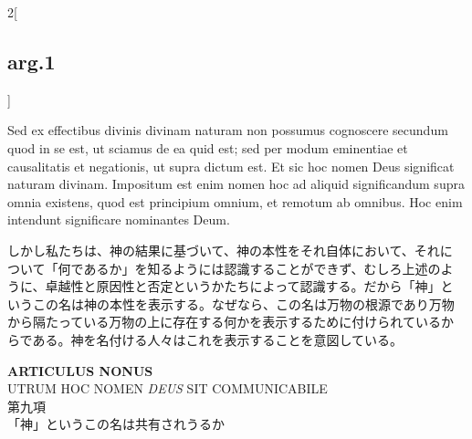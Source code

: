 \documentclass[paper=a4paper,fontsize=10pt,jafontsize=9pt,titlepage]{jlreq}
\begin{document}
\begin{paracol}{2}[\subsection{arg.1}]
\switchcolumn*

Sed ex effectibus divinis divinam naturam non possumus cognoscere
secundum quod in se est, ut sciamus de ea quid est; sed per modum
eminentiae et causalitatis et negationis, ut supra dictum est. Et sic
hoc nomen Deus significat naturam divinam. Impositum est enim nomen
hoc ad aliquid significandum supra omnia existens, quod est principium
omnium, et remotum ab omnibus. Hoc enim intendunt significare
nominantes Deum.

\switchcolumn

しかし私たちは、神の結果に基づいて、神の本性をそれ自体において、それに
ついて「何であるか」を知るようには認識することができず、むしろ上述のよ
うに、卓越性と原因性と否定というかたちによって認識する。だから「神」と
いうこの名は神の本性を表示する。なぜなら、この名は万物の根源であり万物
から隔たっている万物の上に存在する何かを表示するために付けられているか
らである。神を名付ける人々はこれを表示することを意図している。

\end{paracol}
\newpage
{}

\begin{center}
{\Large {\bfseries ARTICULUS NONUS}}\\
{\large UTRUM HOC NOMEN {\itshape DEUS} SIT COMMUNICABILE}\\
{\Large 第九項\\「神」というこの名は共有されうるか}
\end{center}

{}
\setcounter{section}{9}
\setcounter{subsection}{0}
\end{document}
